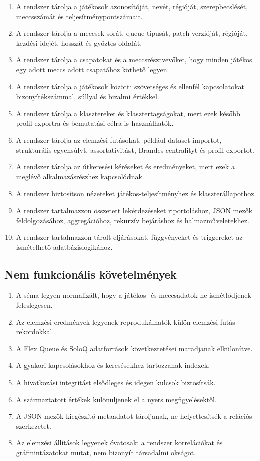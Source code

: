 \documentclass[12pt,a4paper]{article}
\begin{document}
\begin{enumerate}
  \item A rendszer tárolja a játékosok azonosítóját, nevét, régióját, szerepbecslését, meccsszámát és teljesítménypontszámait.
  \item A rendszer tárolja a meccsek sorát, queue típusát, patch verzióját, régióját, kezdési idejét, hosszát és győztes oldalát.
  \item A rendszer tárolja a csapatokat és a meccsrésztvevőket, hogy minden játékos egy adott meccs adott csapatához köthető legyen.
  \item A rendszer tárolja a játékosok közötti szövetséges és ellenfél kapcsolatokat bizonyítékszámmal, súllyal és bizalmi értékkel.
  \item A rendszer tárolja a klasztereket és klasztertagságokat, mert ezek később profil-exportra és bemutatási célra is használhatók.
  \item A rendszer tárolja az elemzési futásokat, például dataset importot, strukturális egyensúlyt, assortativitást, Brandes centralityt és profil-exportot.
  \item A rendszer tárolja az útkeresési kéréseket és eredményeket, mert ezek a meglévő alkalmazásrészhez kapcsolódnak.
  \item A rendszer biztosítson nézeteket játékos-teljesítményhez és klaszterállapothoz.
  \item A rendszer tartalmazzon összetett lekérdezéseket riportoláshoz, JSON mezők feldolgozásához, aggregációhoz, rekurzív bejáráshoz és halmazműveletekhez.
  \item A rendszer tartalmazzon tárolt eljárásokat, függvényeket és triggereket az ismételhető adatbázislogikához.
\end{enumerate}

\subsection{Nem funkcionális követelmények}

\begin{enumerate}
  \item A séma legyen normalizált, hogy a játékos- és meccsadatok ne ismétlődjenek feleslegesen.
  \item Az elemzési eredmények legyenek reprodukálhatók külön elemzési futás rekordokkal.
  \item A Flex Queue és SoloQ adatforrások következtetései maradjanak elkülönítve.
  \item A gyakori kapcsolásokhoz és keresésekhez tartozzanak indexek.
  \item A hivatkozási integritást elsődleges és idegen kulcsok biztosítsák.
  \item A származtatott értékek különüljenek el a nyers megfigyelésektől.
  \item A JSON mezők kiegészítő metaadatot tároljanak, ne helyettesítsék a relációs szerkezetet.
  \item Az elemzési állítások legyenek óvatosak: a rendszer korrelációkat és gráfmintázatokat mutat, nem bizonyít társadalmi okságot.
\end{enumerate}
\end{document}
